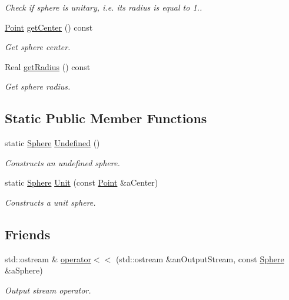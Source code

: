 \begin{DoxyCompactItemize}
\begin{DoxyCompactList}\small\item\em Check if sphere is unitary, i.\+e. its radius is equal to 1.. \end{DoxyCompactList}\item 
\hyperlink{classlibrary_1_1math_1_1geom_1_1d3_1_1objects_1_1_point}{Point} \hyperlink{classlibrary_1_1math_1_1geom_1_1d3_1_1objects_1_1_sphere_a871367ab75aa46194a6b8ddc8a45967f}{get\+Center} () const
\begin{DoxyCompactList}\small\item\em Get sphere center. \end{DoxyCompactList}\item 
Real \hyperlink{classlibrary_1_1math_1_1geom_1_1d3_1_1objects_1_1_sphere_a48cfc72b6eec9a953fb837a13e1df45e}{get\+Radius} () const
\begin{DoxyCompactList}\small\item\em Get sphere radius. \end{DoxyCompactList}\end{DoxyCompactItemize}
\subsection*{Static Public Member Functions}
\begin{DoxyCompactItemize}
\item 
static \hyperlink{classlibrary_1_1math_1_1geom_1_1d3_1_1objects_1_1_sphere}{Sphere} \hyperlink{classlibrary_1_1math_1_1geom_1_1d3_1_1objects_1_1_sphere_a777600f8814a2879e925909f30cfe9c4}{Undefined} ()
\begin{DoxyCompactList}\small\item\em Constructs an undefined sphere. \end{DoxyCompactList}\item 
static \hyperlink{classlibrary_1_1math_1_1geom_1_1d3_1_1objects_1_1_sphere}{Sphere} \hyperlink{classlibrary_1_1math_1_1geom_1_1d3_1_1objects_1_1_sphere_a5464ea9145425db63dedbd896d6c97b0}{Unit} (const \hyperlink{classlibrary_1_1math_1_1geom_1_1d3_1_1objects_1_1_point}{Point} \&a\+Center)
\begin{DoxyCompactList}\small\item\em Constructs a unit sphere. \end{DoxyCompactList}\end{DoxyCompactItemize}
\subsection*{Friends}
\begin{DoxyCompactItemize}
\item 
std\+::ostream \& \hyperlink{classlibrary_1_1math_1_1geom_1_1d3_1_1objects_1_1_sphere_abb141c02e081d1acce5f0d840276a5dd}{operator$<$$<$} (std\+::ostream \&an\+Output\+Stream, const \hyperlink{classlibrary_1_1math_1_1geom_1_1d3_1_1objects_1_1_sphere}{Sphere} \&a\+Sphere)
\begin{DoxyCompactList}\small\item\em Output stream operator. \end{DoxyCompactList}\end{DoxyCompactItemize}


